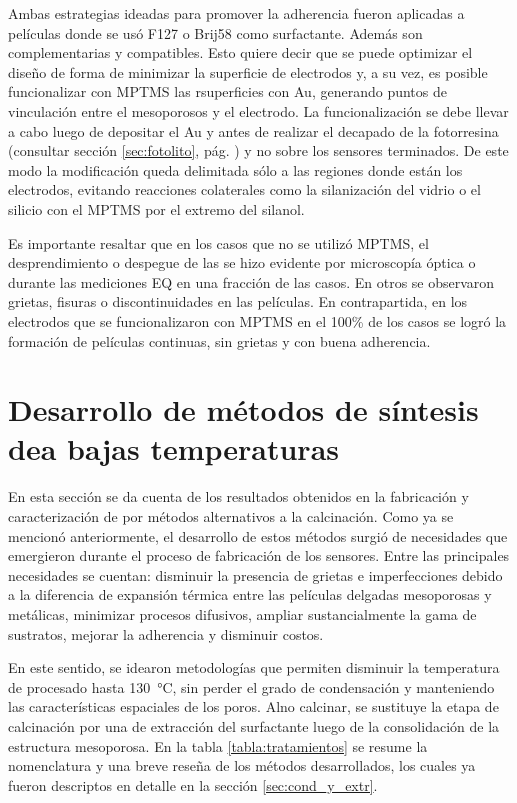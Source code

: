 			 Ambas estrategias ideadas para promover la adherencia fueron aplicadas a películas donde se usó F127 o Brij58 como surfactante. Además son complementarias y compatibles. Esto quiere decir que se puede optimizar el diseño de forma de minimizar la superficie de electrodos y, a su vez, es posible funcionalizar con MPTMS las rsuperficies con Au, generando puntos de vinculación entre el mesoporosos y el electrodo. La funcionalización se debe llevar a cabo luego de depositar el Au y antes de realizar el decapado de la fotorresina (consultar sección \ref{sec:fotolito}, pág. \pageref{sec:fotolito}) y no sobre los sensores terminados. De este modo la modificación queda delimitada sólo a las regiones donde están los electrodos, evitando reacciones colaterales como la silanización del vidrio o el silicio con el MPTMS por el extremo del silanol.

			 Es importante resaltar que en los casos que no se utilizó MPTMS, el desprendimiento o despegue de las \pdm\space se hizo evidente por microscopía óptica o durante las mediciones EQ en una fracción de las casos. En otros se observaron grietas, fisuras o discontinuidades en las películas. En contrapartida, en los electrodos que se funcionalizaron con MPTMS en el 100\% de los casos se logró la formación de películas continuas, sin grietas y con buena adherencia.

\section{Desarrollo de métodos de síntesis de\hspace{2pt}\pdm\hspace{2pt}a bajas temperaturas}
	
	 	 En esta sección se da cuenta de los resultados obtenidos en la fabricación y caracterización de \pdm\space por métodos alternativos a la calcinación. Como ya se mencionó anteriormente, el desarrollo de estos métodos surgió de necesidades que emergieron durante el proceso de fabricación de los sensores. Entre las principales necesidades se cuentan: disminuir la presencia de grietas e imperfecciones debido a la diferencia de expansión térmica entre las películas delgadas mesoporosas y metálicas, minimizar procesos difusivos, ampliar sustancialmente la gama de sustratos, mejorar la adherencia y disminuir costos.

		 En este sentido, se idearon metodologías que permiten disminuir la temperatura de procesado hasta \SI{130}{\celsius}, sin perder el grado de condensación y manteniendo las características espaciales de los poros. Al\space no calcinar, se sustituye la etapa de calcinación por una de extracción del surfactante luego de la consolidación de la estructura mesoporosa. En la tabla \ref{tabla:tratamientos} se resume la nomenclatura y una breve reseña de los métodos desarrollados, los cuales ya fueron descriptos en detalle en la sección \ref{sec:cond_y_extr}.

